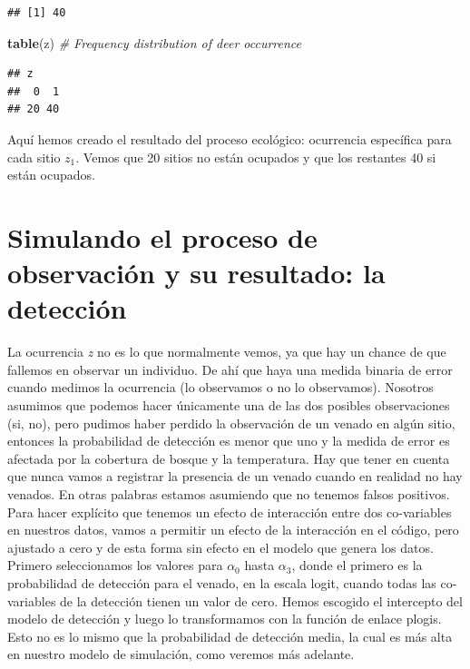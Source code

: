 \documentclass[
]{book}
\newenvironment{Shaded}{\begin{snugshade}}{\end{snugshade}}
\newcommand{\CommentTok}[1]{\textcolor[rgb]{0.56,0.35,0.01}{\textit{#1}}}
\newcommand{\KeywordTok}[1]{\textcolor[rgb]{0.13,0.29,0.53}{\textbf{#1}}}
\newcommand{\NormalTok}[1]{#1}
\begin{document}
\begin{verbatim}
## [1] 40
\end{verbatim}

\begin{Shaded}
\begin{Highlighting}[]
\KeywordTok{table}\NormalTok{(z)                                  }\CommentTok{# Frequency distribution of deer occurrence}
\end{Highlighting}
\end{Shaded}

\begin{verbatim}
## z
##  0  1
## 20 40
\end{verbatim}

Aquí hemos creado el resultado del proceso ecológico: ocurrencia específica para cada sitio \(z _{1}\). Vemos que 20 sitios no están ocupados y que los restantes 40 si están ocupados.

\hypertarget{simulando-el-proceso-de-observaciuxf3n-y-su-resultado-la-detecciuxf3n}{%
\section{Simulando el proceso de observación y su resultado: la detección}\label{simulando-el-proceso-de-observaciuxf3n-y-su-resultado-la-detecciuxf3n}}

La ocurrencia \emph{z} no es lo que normalmente vemos, ya que hay un chance de que fallemos en observar un individuo. De ahí que haya una medida binaria de error cuando medimos la ocurrencia (lo observamos o no lo observamos). Nosotros asumimos que podemos hacer únicamente una de las dos posibles observaciones (si, no), pero pudimos haber perdido la observación de un venado en algún sitio, entonces la probabilidad de detección es menor que uno y la medida de error es afectada por la cobertura de bosque y la temperatura. Hay que tener en cuenta que nunca vamos a registrar la presencia de un venado cuando en realidad no hay venados. En otras palabras estamos asumiendo que no tenemos falsos positivos. Para hacer explícito que tenemos un efecto de interacción entre dos co-variables en nuestros datos, vamos a permitir un efecto de la interacción en el código, pero ajustado a cero y de esta forma sin efecto en el modelo que genera los datos. Primero seleccionamos los valores para \(\alpha _{0}\) hasta \(\alpha _{3}\), donde el primero es la probabilidad de detección para el venado, en la escala logit, cuando todas las co-variables de la detección tienen un valor de cero. Hemos escogido el intercepto del modelo de detección y luego lo transformamos con la función de enlace plogis. Esto no es lo mismo que la probabilidad de detección media, la cual es más alta en nuestro modelo de simulación, como veremos más adelante.
\end{document}
